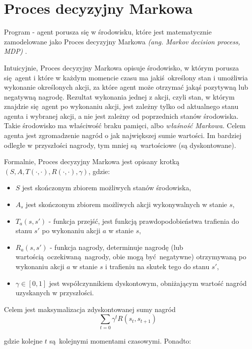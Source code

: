 \section{Proces decyzyjny Markowa}\label{mdp}

Program - agent porusza się w środowisku, które jest matematycznie zamodelowane jako Proces decyzyjny Markowa \textit{(ang. Markov decision process, MDP)} \cite{bellman1954}.

Intuicyjnie, Proces decyzyjny Markowa opisuje środowisko, w którym porusza się agent i które w każdym momencie czasu ma jakiś określony stan i umożliwia wykonanie określonych akcji, za które agent może otrzymać jakąś pozytywną lub negatywną nagrodę. Rezultat wykonania jednej z akcji, czyli stan, w którym znajdzie się agent po wykonaniu akcji, jest zależny tylko od aktualnego stanu agenta i wybranej akcji, a nie jest zależny od poprzednich stanów środowiska. Takie środowisko ma właściwość braku pamięci, albo \textit{właśność Markowa}. Celem agenta jest zgromadzenie nagród o jak największej sumie wartości. Im bardziej odległe w przyszłości nagrody, tym mniej są wartościowe (są dyskontowane).

\vspace{5mm}

Formalnie, Proces decyzyjny Markowa jest opisany krotką $(S,A,T(\cdot,\cdot),R(\cdot,\cdot),\gamma)$, gdzie:
\begin{itemize}
\item $S$ jest skończonym zbiorem możliwych stanów środowiska,
\item $A_s$ jest skończonym zbiorem możliwych akcji wykonywalnych w stanie $s$,
\item $T_a(s,s')$ - funkcja przejść, jest funkcją prawdopodobieństwa trafienia do stanu $s'$ po wykonaniu akcji $a$ w stanie $s$,
\item $R_a(s,s')$ - funkcja nagrody, determinuje nagrodę (lub wartością oczekiwaną nagrody, obie mogą być negatywne) otrzymywaną po wykonaniu akcji $a$ w stanie $s$ i trafieniu na skutek tego do stanu $s'$,
\item $\gamma \in [0,1]$ jest współczynnikiem dyskontowym, obniżającym wartość nagród uzyskanych w przyszłości.
\end{itemize}

Celem jest maksymalizacja zdyskontowanej sumy nagród $$\sum_{t=0}{\gamma^t R(s_t,s_{t+1})}$$

gdzie kolejne $t$ są kolejnymi momentami czasowymi. Ponadto:

